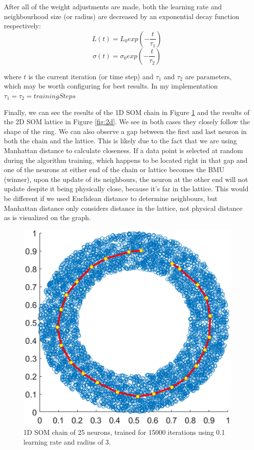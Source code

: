 \documentclass[a4paper,11pt,twocolumn]{article}
\begin{document}
After all of the weight adjustments are made, both the learning rate and neighbourhood size (or radius) are decreased by an exponential decay function respectively:
\[L(t) = L_0exp(-\frac{t}{\tau_1}) \]
\[\sigma(t) = \sigma_0exp(-\frac{t}{\tau_2}) \]

where $t$ is the current iteration (or time step) and $\tau_1$ and $\tau_2$ are parameters, which may be worth configuring for best results. In my implementation $\tau_1 = \tau_2 = trainingSteps$

Finally, we can see the results of the 1D SOM chain in Figure \ref{fig:1d} and the results of the 2D SOM lattice in Figure \ref{fig:2d}. We see in both cases they closely follow the shape of the ring. We can also observe a gap between the first and last neuron in both the chain and the lattice. This is likely due to the fact that we are using Manhattan distance to calculate closeness. If a data point is selected at random during the algorithm training, which happens to be located right in that gap and one of the neurons at either end of the chain or lattice becomes the BMU (winner), upon the update of its neighbours, the neuron at the other end will not update despite it being physically close, because it's far in the lattice. This would be different if we used Euclidean distance to determine neighbours, but Manhattan distance only considers distance in the lattice, not physical distance as is visualized on the graph.

\begin{figure}[!h]
  \centering
  \includegraphics[width=\linewidth]{figures/1d.png}
  \caption{1D SOM chain of 25 neurons, trained for 15000 iterations using 0.1 learning rate and radius of 3.}
  \label{fig:1d}
\end{figure}
\end{document}
